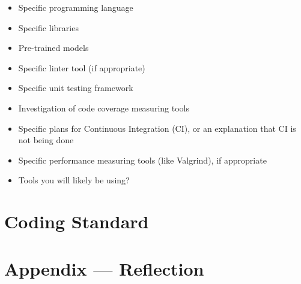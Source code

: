 \documentclass{article}
\begin{document}
\begin{itemize}
\item Specific programming language
\item Specific libraries
\item Pre-trained models
\item Specific linter tool (if appropriate)
\item Specific unit testing framework
\item Investigation of code coverage measuring tools
\item Specific plans for Continuous Integration (CI), or an explanation that CI
  is not being done
\item Specific performance measuring tools (like Valgrind), if
  appropriate
\item Tools you will likely be using?
\end{itemize}


\section{Coding Standard}


\newpage{}

\section*{Appendix --- Reflection}



\end{document}
